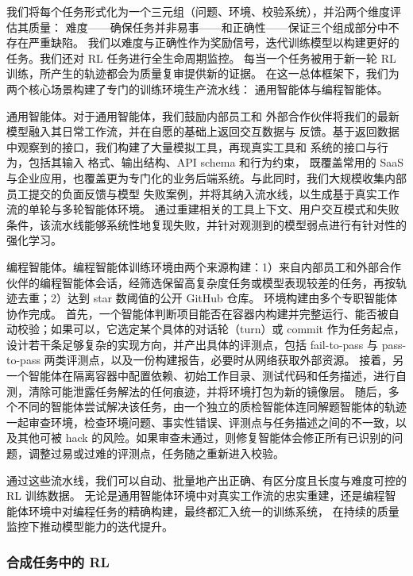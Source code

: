 \documentclass[
  10
]{article}
\begin{document}
我们将每个任务形式化为一个三元组（问题、环境、校验系统），并沿两个维度评估其质量：
难度——确保任务并非易事——和正确性——保证三个组成部分中不存在严重缺陷。
我们以难度与正确性作为奖励信号，迭代训练模型以构建更好的任务。我们还对 RL 任务进行全生命周期监控。
每当一个任务被用于新一轮 RL 训练，所产生的轨迹都会为质量复审提供新的证据。
在这一总体框架下，我们为两个核心场景构建了专门的训练环境生产流水线：
通用智能体与编程智能体。



通用智能体。对于通用智能体，我们鼓励内部员工和
外部合作伙伴将我们的最新模型融入其日常工作流，并在自愿的基础上返回交互数据与
反馈。基于返回数据中观察到的接口，我们构建了大量模拟工具，再现真实工具和
系统的接口与行为，包括其输入
格式、输出结构、API schema 和行为约束，
既覆盖常用的 SaaS 与企业应用，也覆盖更为专门化的业务后端系统。与此同时，我们大规模收集内部员工提交的负面反馈与模型
失败案例，并将其纳入流水线，以生成基于真实工作流的单轮与多轮智能体环境。
通过重建相关的工具上下文、用户交互模式和失败条件，该流水线能够系统性地复现失败，并针对观测到的模型弱点进行有针对性的强化学习。

编程智能体。编程智能体训练环境由两个来源构建：1）来自内部员工和外部合作伙伴的编程智能体会话，经筛选保留高复杂度任务或模型表现较差的任务，再按轨迹去重；2）达到 star 数阈值的公开 GitHub 仓库。
环境构建由多个专职智能体协作完成。
首先，一个智能体判断项目能否在容器内构建并完整运行、能否被自动校验；如果可以，它选定某个具体的对话轮（turn）或 commit 作为任务起点，设计若干条足够复杂的实现方向，并产出具体的评测点，包括 fail-to-pass 与 pass-to-pass 两类评测点，以及一份构建报告，必要时从网络获取外部资源。
接着，另一个智能体在隔离容器中配置依赖、初始工作目录、测试代码和任务描述，进行自测，清除可能泄露任务解法的任何痕迹，并将环境打包为新的镜像层。
随后，多个不同的智能体尝试解决该任务，由一个独立的质检智能体连同解题智能体的轨迹一起审查环境，检查环境问题、事实性错误、评测点与任务描述之间的不一致，以及其他可被 hack 的风险。如果审查未通过，则修复智能体会修正所有已识别的问题，调整过易或过难的评测点，任务随之重新进入校验。

通过这些流水线，我们可以自动、批量地产出正确、有区分度且长度与难度可控的 RL 训练数据。
无论是通用智能体环境中对真实工作流的忠实重建，还是编程智能体环境中对编程任务的精确构建，最终都汇入统一的训练系统，
在持续的质量监控下推动模型能力的迭代提升。

\subsubsection{合成任务中的 RL}\label{rl-in-synthesized-tasks}
\end{document}
